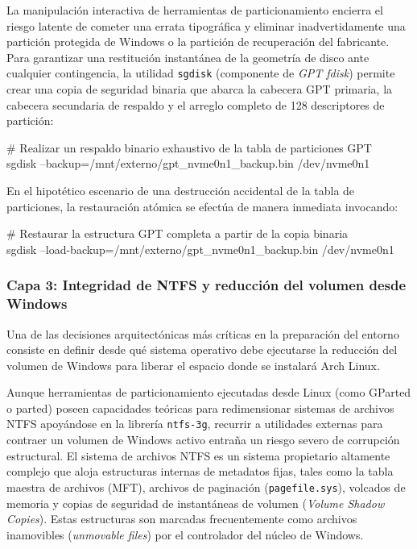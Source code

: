 \documentclass[12pt]{article}
\begin{document}
La manipulación interactiva de herramientas de particionamiento encierra el riesgo latente de cometer una errata tipográfica y eliminar inadvertidamente una partición protegida de Windows o la partición de recuperación del fabricante. Para garantizar una restitución instantánea de la geometría de disco ante cualquier contingencia, la utilidad \texttt{sgdisk} (componente de \textit{GPT fdisk}) permite crear una copia de seguridad binaria que abarca la cabecera GPT primaria, la cabecera secundaria de respaldo y el arreglo completo de 128 descriptores de partición:

\begin{mdframed}[style=terminal]
\ttfamily\upshape\color{bashLetterColor}\footnotesize
\# Realizar un respaldo binario exhaustivo de la tabla de particiones GPT \\
sgdisk --backup=/mnt/externo/gpt\_nvme0n1\_backup.bin /dev/nvme0n1
\end{mdframed}

En el hipotético escenario de una destrucción accidental de la tabla de particiones, la restauración atómica se efectúa de manera inmediata invocando:
\begin{mdframed}[style=terminal]
\ttfamily\upshape\color{bashLetterColor}\footnotesize
\# Restaurar la estructura GPT completa a partir de la copia binaria \\
sgdisk --load-backup=/mnt/externo/gpt\_nvme0n1\_backup.bin /dev/nvme0n1
\end{mdframed}

\subsubsection{Capa 3: Integridad de NTFS y reducción del volumen desde Windows}

Una de las decisiones arquitectónicas más críticas en la preparación del entorno consiste en definir desde qué sistema operativo debe ejecutarse la reducción del volumen de Windows para liberar el espacio donde se instalará Arch Linux. 

Aunque herramientas de particionamiento ejecutadas desde Linux (como GParted o parted) poseen capacidades teóricas para redimensionar sistemas de archivos NTFS apoyándose en la librería \texttt{ntfs-3g}, recurrir a utilidades externas para contraer un volumen de Windows activo entraña un riesgo severo de corrupción estructural. El sistema de archivos NTFS es un sistema propietario altamente complejo que aloja estructuras internas de metadatos fijas, tales como la tabla maestra de archivos (MFT), archivos de paginación (\texttt{pagefile.sys}), volcados de memoria y copias de seguridad de instantáneas de volumen (\textit{Volume Shadow Copies}). Estas estructuras son marcadas frecuentemente como archivos inamovibles (\textit{unmovable files}) por el controlador del núcleo de Windows.
\end{document}

